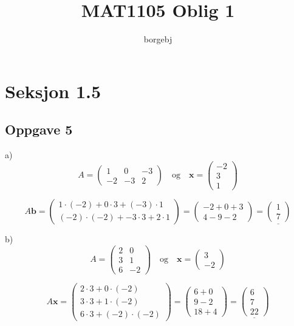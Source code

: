 \documentclass{article}
\title{MAT1105 Oblig 1}
\author{borgebj}
\date{}
\begin{document}
\maketitle

\section*{Seksjon 1.5}

\subsection*{Oppgave 5}

a) 
\[A = \begin{pmatrix}
    1 & 0 & -3 \\
    -2 & -3 & 2
\end{pmatrix} 
\quad \text{og} \quad \textbf{x} = \begin{pmatrix}
    -2\\3\\1
\end{pmatrix}\]

\[A\textbf{b} = \begin{pmatrix}
    1 \cdot (-2) + 0 \cdot 3 + (-3) \cdot 1\\
    (-2) \cdot (-2) + -3 \cdot 3 + 2 \cdot 1
\end{pmatrix} = \begin{pmatrix}
    -2 + 0 + 3 \\ 4 - 9 - 2
\end{pmatrix} = \underline{\begin{pmatrix}
    1\\7
\end{pmatrix}}\]



b) 
\[A = \begin{pmatrix}
    2 & 0  \\
    3 & 1 \\
    6 & -2
\end{pmatrix} 
\quad \text{og} \quad \textbf{x} = \begin{pmatrix}
    3\\-2
\end{pmatrix}\]

\[A\textbf{x} = \begin{pmatrix}
    2 \cdot 3 + 0 \cdot (-2) \\ 3 \cdot 3 + 1 \cdot (-2) \\ 6 \cdot 3 + (-2) \cdot ( -2)
\end{pmatrix} = \begin{pmatrix}
    6 + 0 \\ 9 - 2 \\ 18 + 4
\end{pmatrix} = \underline{\begin{pmatrix}
    6 \\ 7 \\ 22
\end{pmatrix}}\]
\end{document}
